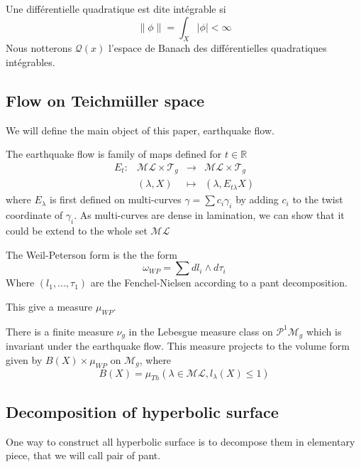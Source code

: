 Une différentielle quadratique est dite intégrable si \[
 \| \phi \| = \int_X | \phi | < \infty
\]
Nous notterons $\mathcal{Q}(x)$ l'espace de Banach des différentielles quadratiques intégrables.

\subsection{Flow on Teichmüller space}

We will define the main object of this paper, earthquake flow.
\begin{dfnt}
The earthquake flow is family of maps defined for $t \in \mathbb{R}$
\[
\begin{array}{crcl}

E_t: & \mathcal{ML}\times \mathcal{T}_g & \to & \mathcal{ML}\times \mathcal{T}_g \\

& (\lambda,X) & \mapsto & (\lambda,E_{t\lambda}X)

\end{array}
\]
where $E_\lambda$ is first defined on multi-curves $\gamma =\sum c_i \gamma_i$ by adding $c_i$ to the twist coordinate of $\gamma_i$.
As multi-curves are dense in lamination, we can show that it could be extend to the whole set $\mathcal{ML}$
\end{dfnt}

\begin{dfnt}
The Weil-Peterson form is the the form \[
\omega_{WP} = \sum d l_i \wedge d \tau_i
\]
Where $(l_1,...,\tau_1)$ are the Fenchel-Nielsen according to a pant decomposition.

This give a measure $\mu_{WP}$.
\end{dfnt}

There is a finite measure $\nu_g$ in the Lebesgue measure class on $\mathcal{P}^1 \mathcal{M}_g$ which is invariant under the earthquake flow. This measure projects to the volume form given by $B(X) \times \mu_{WP}$ on $\mathcal{M}_g$, where \[
B(X)=\mu_{Th}(\lambda \in \mathcal{ML}, l_\lambda(X) \leq 1)
\]


\subsection{Decomposition of hyperbolic surface}

One way to construct all hyperbolic surface is to decompose them in elementary piece, that we will call pair of pant.

